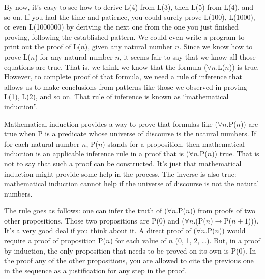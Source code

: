 \label{induction-rationale}
By now, it's easy to see how to derive L(4) from L(3),
then L(5) from L(4), and so on.
If you had the time and patience, you could surely prove L(100), L(1000), or even L(1000000)
by deriving the next one from the one you just finished proving,
following the established pattern.
We could even write a program to print out the proof of L($n$), given any natural number $n$.
Since we know how to prove L($n$) for any natural number $n$,
it seems fair to say that we know all those equations are true.
That is, we think we know that the formula ($\forall$$n$.L($n$)) is true.
However, to complete proof of that formula,
we need a rule of inference that allows us to make conclusions
from patterns like those we observed in proving L(1), L(2), and so on.
That rule of inference is known as ``mathematical induction''.

Mathematical induction provides a way to prove that
formulas like ($\forall$$n$.P($n$)) are true
when P is a predicate whose universe of discourse is the natural numbers.
If for each natural number $n$, P($n$) stands for a proposition,
then mathematical induction is an applicable inference rule
in a proof that is ($\forall$$n$.P($n$)) true.
That is not to say that such a proof can be constructed.
It's just that mathematical induction might provide some help in the process.
The inverse is also true: mathematical induction cannot help
if the universe of discourse is not the natural numbers.

The rule goes as follows: one can infer the truth of ($\forall$$n$.P($n$))
from proofs of two other propositions.
Those two propositions are P(0) and ($\forall$$n$.(P($n$)$\rightarrow$P($n+1$))).
It's a very good deal if you think about it.
A direct proof of ($\forall$$n$.P($n$)) would require a proof of proposition P($n$)
for each value of $n$ (0, 1, 2, \dots).
But, in a proof by induction, the only proposition that needs to be proved on its own is P(0).
In the proof any of the other propositions,
you are allowed to cite the previous one in the sequence as a justification for any step in the proof.

